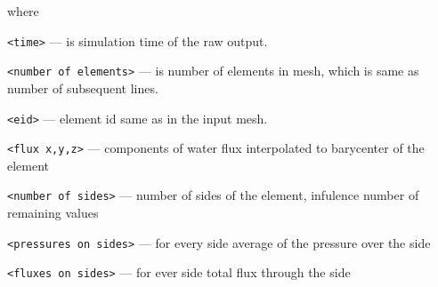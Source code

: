where 
\begin{description}
 \item \verb'<time>' --- is simulation time of the raw output.
 \item \verb'<number of elements>' --- is number of elements in mesh, which is same as number of subsequent lines.
 \item \verb'<eid>' --- element id same as in the input mesh.
 \item \verb'<flux x,y,z>' --- components of water flux interpolated to barycenter of the element
 \item \verb'<number of sides>' --- number of sides of the element, infulence number of remaining values
 \item \verb'<pressures on sides>' --- for every side average of the pressure over the side
 \item \verb'<fluxes on sides>' --- for ever side total flux through the side 
\end{description}

